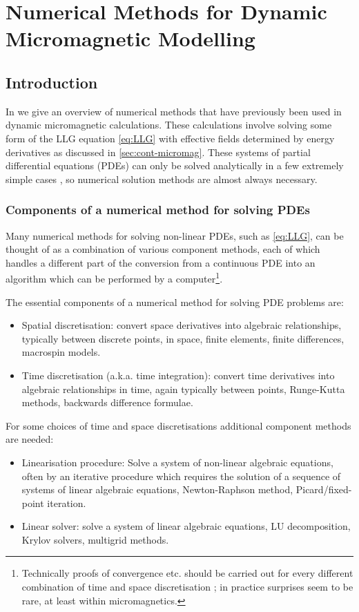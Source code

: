 \chapter{Numerical Methods for Dynamic Micromagnetic Modelling}
\label{sec:numer-meth-micr}

\section{Introduction}

In  we give an overview of numerical methods that have previously been used in dynamic micromagnetic calculations.
These calculations involve solving some form of the LLG equation \cref{eq:LLG} with effective fields determined by energy derivatives as discussed in \cref{sec:cont-micromag}.
These systems of partial differential equations (PDEs) can only be solved analytically in a few extremely simple cases \cite{Aharoni1996}, so numerical solution methods are almost always necessary.


\subsection{Components of a numerical method for solving PDEs}

Many numerical methods for solving non-linear PDEs, such as \cref{eq:LLG}, can be thought of as a combination of various component methods, each of which handles a different part of the conversion from a continuous PDE into an algorithm which can be performed by a computer\footnote{Technically proofs of convergence etc. should be carried out for every different combination of time and space discretisation \cite[382]{Iserles2009}; in practice surprises seem to be rare, at least within micromagnetics.}.

The essential components of a numerical method for solving PDE problems are:
\begin{itemize}
\item Spatial discretisation: convert space derivatives into algebraic relationships, typically between discrete points, in space, \eg finite elements, finite differences, macrospin models. 
\item Time discretisation (a.k.a. time integration):  convert time derivatives into algebraic relationships in time, again typically between points, \eg Runge-Kutta methods, backwards difference formulae.
\end{itemize}
For some choices of time and space discretisations additional component methods are needed:
\begin{itemize}
\item Linearisation procedure: Solve a system of non-linear algebraic equations, often by an iterative procedure which requires the solution of a sequence of systems of linear algebraic equations, \eg Newton-Raphson method, Picard/fixed-point iteration. 
\item Linear solver: solve a system of linear algebraic equations, \eg LU decomposition, Krylov solvers, multigrid methods. 
\end{itemize}

